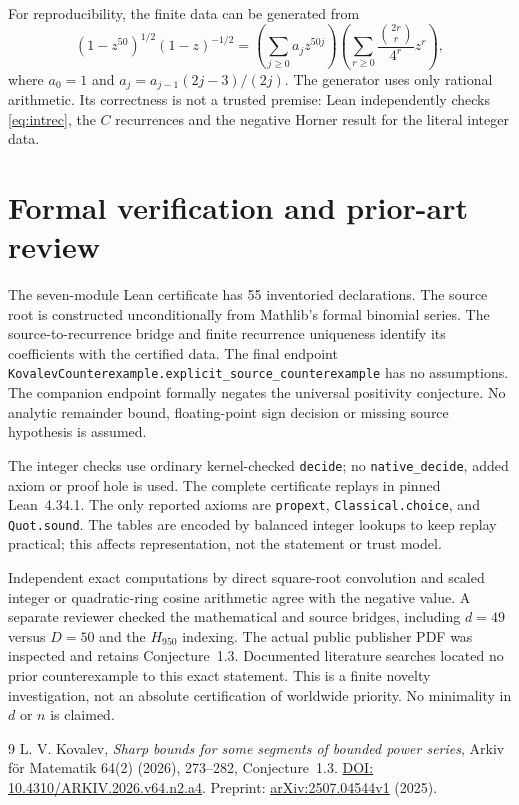 \documentclass[11pt]{article}
\begin{document}
For reproducibility, the finite data can be generated from
\[
 (1-z^{50})^{1/2}(1-z)^{-1/2}
  =\left(\sum_{j\geq0}a_jz^{50j}\right)
   \left(\sum_{r\geq0}\frac{\binom{2r}{r}}{4^r}z^r\right),
\]
where $a_0=1$ and $a_j=a_{j-1}(2j-3)/(2j)$.
The generator uses only rational arithmetic. Its correctness is not a
trusted premise: Lean independently checks \eqref{eq:intrec}, the $C$
recurrences and the negative Horner result for the literal integer data.

\section{Formal verification and prior-art review}
The seven-module Lean certificate has 55 inventoried declarations.
The source root is constructed unconditionally from Mathlib's formal
binomial series. The source-to-recurrence bridge and finite recurrence
uniqueness identify its coefficients with the certified data. The final
endpoint \texttt{KovalevCounterexample.explicit\_source\_counterexample}
has no assumptions. The companion endpoint formally negates the universal
positivity conjecture. No analytic remainder bound, floating-point sign
decision or missing source hypothesis is assumed.

The integer checks use ordinary kernel-checked \texttt{decide}; no
\texttt{native\_decide}, added axiom or proof hole is used. The complete
certificate replays in pinned Lean~4.34.1. The only reported axioms are
\texttt{propext}, \texttt{Classical.choice}, and \texttt{Quot.sound}.
The tables are encoded by balanced integer lookups to keep replay
practical; this affects representation, not the statement or trust model.

Independent exact computations by direct square-root convolution and
scaled integer or quadratic-ring cosine arithmetic agree with the
negative value. A separate reviewer checked the mathematical and source
bridges, including $d=49$ versus $D=50$ and the $H_{950}$ indexing.
The actual public publisher PDF was inspected and retains Conjecture~1.3.
Documented literature searches located no prior counterexample to this
exact statement. This is a finite novelty investigation, not an absolute
certification of worldwide priority. No minimality in $d$ or $n$ is claimed.

\begin{thebibliography}{9}
 L. V. Kovalev,
\emph{Sharp bounds for some segments of bounded power series},
Arkiv f\"or Matematik 64(2) (2026), 273--282, Conjecture~1.3.
\href{https://doi.org/10.4310/ARKIV.2026.v64.n2.a4}{DOI: 10.4310/ARKIV.2026.v64.n2.a4}.
Preprint: \href{https://arxiv.org/abs/2507.04544v1}{arXiv:2507.04544v1} (2025).
\end{thebibliography}
\end{document}
